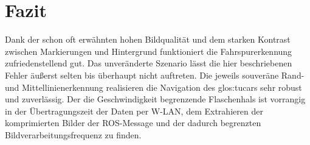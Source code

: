 





\section{Fazit \dcfirstauthorshort}
Dank der schon oft erwähnten hohen Bildqualität und dem starken Kontrast zwischen Markierungen und Hintergrund funktioniert die Fahrspurerkennung zufriedenstellend gut. Das unveränderte Szenario lässt die hier beschriebenen Fehler äußerst selten bis überhaupt nicht auftreten. Die jeweils souveräne Rand-und Mittellinienerkennung realisieren die Navigation des \gls{glos:tucar}s sehr robust und zuverlässig. Der die Geschwindigkeit begrenzende Flaschenhals ist vorrangig in der Übertragungszeit der Daten per W-LAN, dem Extrahieren der komprimierten Bilder der ROS-Message und der dadurch begrenzten Bildverarbeitungsfrequenz zu finden. 


